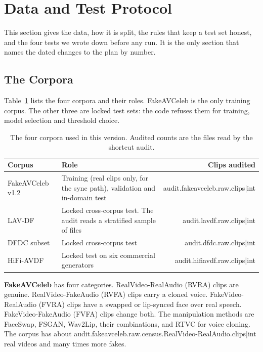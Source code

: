 \section{Data and Test Protocol}
\label{ch:setup}

This section gives the data, how it is split, the rules that keep a test set
honest, and the four tests we wrote down before any run. It is the only
section that names the dated changes to the plan by number.

\subsection{The Corpora}

Table~\ref{tab:corpora} lists the four corpora and their roles. FakeAVCeleb is
the only training corpus. The other three are locked test sets: the code
refuses them for training, model selection and threshold choice.

\begin{table}[ht]
    \centering
    \small
    \caption{The four corpora used in this version. Audited counts are the files read by the shortcut audit.}
    \label{tab:corpora}
    \begin{tabularx}{\textwidth}{@{}l>{\raggedright\arraybackslash}Xr@{}}
        \toprule
        \textbf{Corpus} & \textbf{Role} & \textbf{Clips audited} \\
        \midrule
        FakeAVCeleb v1.2~\cite{fakeavceleb} & Training (real clips only, for the sync path), validation and in-domain test & {{audit.fakeavceleb.raw.clips|int}} \\
        LAV-DF~\cite{lavdf} & Locked cross-corpus test. The audit reads a stratified sample of files & {{audit.lavdf.raw.clips|int}} \\
        DFDC subset~\cite{dfdc} & Locked cross-corpus test & {{audit.dfdc.raw.clips|int}} \\
        HiFi-AVDF~\cite{havic} & Locked test on six commercial generators & {{audit.hifiavdf.raw.clips|int}} \\
        \bottomrule
    \end{tabularx}
\end{table}

\textbf{FakeAVCeleb} has four categories. RealVideo-RealAudio (RVRA) clips are
genuine. RealVideo-FakeAudio (RVFA) clips carry a cloned voice. FakeVideo-RealAudio
(FVRA) clips have a swapped or lip-synced face over real speech.
FakeVideo-FakeAudio (FVFA) clips change both. The manipulation methods are
FaceSwap, FSGAN, Wav2Lip, their combinations, and RTVC for voice cloning. The
corpus has about {{audit.fakeavceleb.raw.census.RealVideo-RealAudio.clips|int}}
real videos and many times more fakes.

